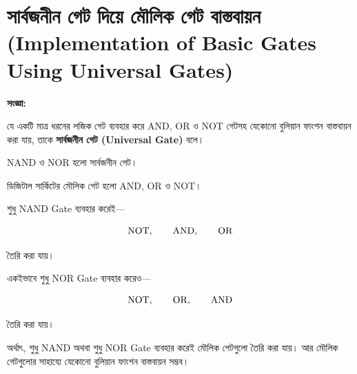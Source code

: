 
\section{সার্বজনীন গেট দিয়ে মৌলিক গেট বাস্তবায়ন
(\textenglish{Implementation of Basic Gates Using Universal Gates})}


\par\begingroup

\textbf{সংজ্ঞা:}

যে একটি মাত্র ধরনের লজিক গেট ব্যবহার করে
\textenglish{AND}, \textenglish{OR} ও \textenglish{NOT} গেটসহ
যেকোনো বুলিয়ান ফাংশন বাস্তবায়ন করা যায়,
তাকে \textbf{সার্বজনীন গেট
(\textenglish{Universal Gate})} বলে।

\textenglish{NAND} ও \textenglish{NOR} হলো সার্বজনীন গেট।
\par\endgroup



\par\begingroup
{}


ডিজিটাল সার্কিটের মৌলিক গেট হলো
\textenglish{AND}, \textenglish{OR} ও \textenglish{NOT}।

শুধু \textenglish{NAND Gate} ব্যবহার করেই—

\[
\text{\textenglish{NOT}},
\qquad
\text{\textenglish{AND}},
\qquad
\text{\textenglish{OR}}
\]

তৈরি করা যায়।

একইভাবে শুধু \textenglish{NOR Gate} ব্যবহার করেও—

\[
\text{\textenglish{NOT}},
\qquad
\text{\textenglish{OR}},
\qquad
\text{\textenglish{AND}}
\]

তৈরি করা যায়।

অর্থাৎ, শুধু \textenglish{NAND} অথবা শুধু
\textenglish{NOR Gate} ব্যবহার করেই মৌলিক গেটগুলো তৈরি করা যায়।
আর মৌলিক গেটগুলোর সাহায্যে যেকোনো বুলিয়ান ফাংশন বাস্তবায়ন সম্ভব।

